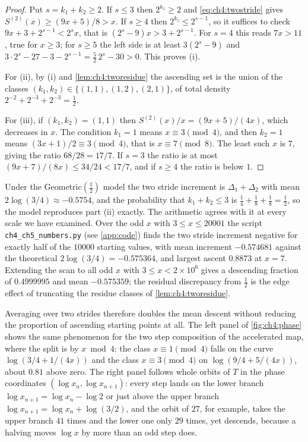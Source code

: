 \begin{proof}
Put $s=k_1+k_2\ge2$.  If $s\le3$ then $2^{k_1}\ge2$ and \eqref{eq:ch4:twostride}
gives $S^{(2)}(x)\ge(9x+5)/8>x$.  If $s\ge4$ then $2^{k_1}\le2^{s-1}$, so it
suffices to check $9x+3+2^{s-1}<2^sx$, that is $(2^s-9)x>3+2^{s-1}$.  For
$s=4$ this reads $7x>11$, true for $x\ge3$; for $s\ge5$ the left side is at
least $3(2^s-9)$ and $3\cdot2^s-27-3-2^{s-1}=\tfrac52\,2^s-30>0$.  This
proves (i).

For (ii), by (i) and \cref{lem:ch4:tworesidue} the ascending set is the union
of the classes $(k_1,k_2)\in\{(1,1),(1,2),(2,1)\}$, of total density
$2^{-2}+2^{-3}+2^{-3}=\tfrac12$.

For (iii), if $(k_1,k_2)=(1,1)$ then $S^{(2)}(x)/x=(9x+5)/(4x)$, which
decreases in $x$.  The condition $k_1=1$ means $x\equiv3\pmod4$, and then
$k_2=1$ means $(3x+1)/2\equiv3\pmod4$, that is $x\equiv7\pmod8$.  The least
such $x$ is $7$, giving the ratio $68/28=17/7$.  If $s=3$ the ratio is at most
$(9x+7)/(8x)\le34/24<17/7$, and if $s\ge4$ the ratio is below $1$.
\end{proof}

Under the Geometric$(\tfrac12)$ model the two stride increment is
$\Delta_1+\Delta_2$ with mean $2\log(3/4)\approx-0.5754$, and the probability
that $k_1+k_2\le3$ is $\tfrac14+\tfrac18+\tfrac18=\tfrac12$, so the model
reproduces part (ii) exactly.  The arithmetic agrees with it at every scale we
have examined.  Over the odd $x$ with $3\le x\le20001$ the script \texttt{ch4\_ch5\_numbers.py} (see
\cref{app:code}) finds the two stride increment negative for exactly half of
the $10000$ starting values, with mean increment $-0.574681$ against the
theoretical $2\log(3/4)=-0.575364$, and largest ascent $0.8873$ at $x=7$.
Extending the scan to all odd $x$ with $3\le x<2\times10^6$ gives a descending fraction of
$0.4999995$ and mean $-0.575359$; the residual discrepancy from $\tfrac12$ is
the edge effect of truncating the residue classes of
\cref{lem:ch4:tworesidue}.

Averaging over two strides therefore doubles the mean descent without
reducing the proportion of ascending starting points at all.  The left panel
of \cref{fig:ch4:phase} shows the same phenomenon for the two step composition
of the accelerated map, where the split is by $x\bmod4$: the class
$x\equiv1\pmod4$ falls on the curve $\log(3/4+1/(4x))$ and the class
$x\equiv3\pmod4$ on $\log(9/4+5/(4x))$, about $0.81$ above zero.
The right panel follows whole orbits of $T$ in the phase coordinates $(\log x_n,\log x_{n+1})$: every step lands on the lower branch $\log x_{n+1}=\log x_n-\log2$ or just above the upper branch $\log x_{n+1}=\log x_n+\log(3/2)$, and the orbit of $27$, for example, takes the upper branch $41$ times and the lower one only $29$ times, yet descends, because a halving moves $\log x$ by more than an odd step does.

